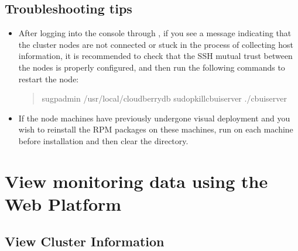 \documentclass[letterpaper,10pt,english]{sphinxmanual}
\begin{document}
\section{Troubleshooting tips}
\label{\detokenize{deploy-guides/physical-deploy/visualized-deploy:troubleshooting-tips}}\begin{itemize}
\item {} 
\sphinxAtStartPar
After logging into the console through , if you see a message indicating that the cluster nodes are not connected or stuck in the process of collecting host information, it is recommended to check that the SSH mutual trust between the nodes is properly configured, and then run the following commands to restart the node:
\begin{quote}

\begin{sphinxVerbatim}[commandchars=\\\{\}]
su\PYGZhy{}gpadmin
/usr/local/cloudberry\PYGZhy{}db
sudopkillcbuiserver
./cbuiserver
\end{sphinxVerbatim}
\end{quote}

\item {} 
\sphinxAtStartPar
If the node machines have previously undergone visual deployment and you wish to reinstall the RPM packages on these machines, run  on each machine before installation and then clear the  directory.

\end{itemize}

\sphinxstepscope


\chapter{View monitoring data using the Web Platform}
\label{\detokenize{manage-system/web-platform-monitoring/web-platform-monitoring-index:view-monitoring-data-using-the-web-platform}}\label{\detokenize{manage-system/web-platform-monitoring/web-platform-monitoring-index::doc}}
\sphinxstepscope


\section{View Cluster Information}
\label{\detokenize{manage-system/web-platform-monitoring/web-platform-view-cluster-overview:view-cluster-information}}\label{\detokenize{manage-system/web-platform-monitoring/web-platform-view-cluster-overview::doc}}
\end{document}
